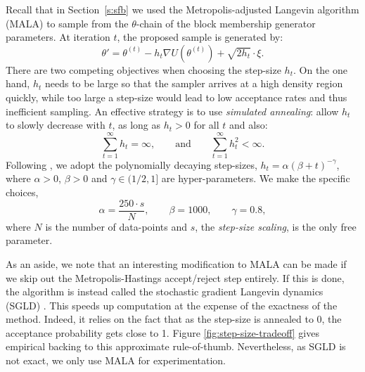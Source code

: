 Recall that in 
Section~\ref{s:sfb} we used 
the Metropolis-adjusted Langevin algorithm (MALA)
to 
sample from the $\theta$-chain of the block membership 
generator parameters.
At iteration $t$, the proposed sample is generated by:
%
\begin{equation}
	\theta' = \theta^{(t)} - h_t \nabla U(\theta^{(t)}) + \sqrt{2h_t} \cdot \xi.
\end{equation}
%
There are two competing objectives when choosing the step-size $h_t$. 
On the one hand, $h_t$ needs to be large so that the sampler
arrives at a high density region quickly,
while too large a step-size would lead to low acceptance rates and thus 
inefficient sampling. An effective strategy is
to use {\em simulated annealing}: allow $h_t$ to slowly decrease
with $t$, as long as $h_t>0$ for all $t$ and also:
%
\begin{equation}
	\sum_{t=1}^{\infty} h_t = \infty, \qquad \textrm{and} \qquad
	\sum_{t=1}^{\infty} h_t^2 < \infty.
	\label{eqn:h-constraints}
\end{equation}
%
Following \citet{Bayesian-SGLD}, we adopt the 
polynomially decaying step-sizes,
%
$h_t = \alpha(\beta + t)^{-\gamma}$,
%
where $\alpha>0$, $\beta>0$ and $\gamma\in(1/2,1]$ are hyper-parameters.
We make the specific choices,
%
\begin{equation}
	\alpha = \frac{250 \cdot s}{N}, \qquad \beta = 1000, \qquad \gamma = 0.8,
	\label{eqn:step-size-params}
\end{equation}
%
where $N$ is the number of data-points and $s$,
the {\em step-size scaling}, is the only free parameter.

As an aside, we note that an interesting modification to MALA can be made if we skip out the Metropolis-Hastings accept/reject step entirely. If this is done, the algorithm is instead called the stochastic gradient Langevin dynamics (SGLD) \cite{Bayesian-SGLD}. This speeds up computation at the expense of the exactness of the method. Indeed, it relies on the fact that as the step-size is annealed to 0, the acceptance probability gets close to 1. Figure \ref{fig:step-size-tradeoff} gives empirical backing to this approximate rule-of-thumb. Nevertheless, as SGLD is not exact, we only use MALA for experimentation.

